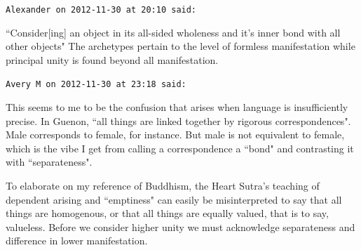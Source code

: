 \begin{footnotesize}
\begin{sffamily}
\hfill

\texttt{Alexander on 2012-11-30 at 20:10 said: }

``Consider[ing] an object in its all-sided wholeness and it's inner bond with all other objects" The archetypes pertain to the level of formless manifestation while principal unity is found beyond all manifestation.


\hfill

\texttt{Avery M on 2012-11-30 at 23:18 said: }

This seems to me to be the confusion that arises when language is insufficiently precise. In Guenon, ``all things are linked together by rigorous correspondences". Male corresponds to female, for instance. But male is not equivalent to female, which is the vibe I get from calling a correspondence a ``bond" and contrasting it with ``separateness".

To elaborate on my reference of Buddhism, the Heart Sutra's teaching of dependent arising and ``emptiness" can easily be misinterpreted to say that all things are homogenous, or that all things are equally valued, that is to say, valueless. Before we consider higher unity we must acknowledge separateness and difference in lower manifestation.


\hfill


\end{sffamily}\end{footnotesize}
